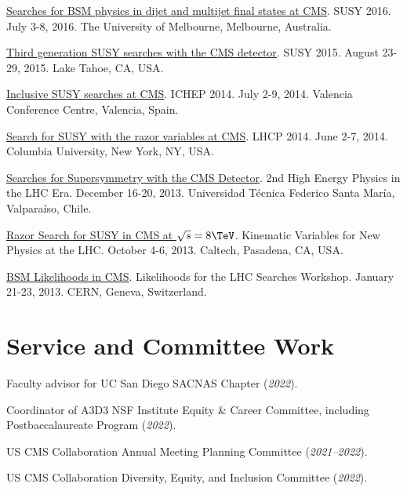 \documentclass{res}
\newcommand{\MarginText}[1]{\section{#1}\vspace{10pt}}
\begin{document}
\begin{resume}
{  \href{https://indico.cern.ch/event/443176/contributions/2154549/}{Searches for BSM physics in dijet and multijet final states at CMS}. SUSY 2016. July 3-8, 2016. The University of Melbourne, Melbourne, Australia.

  \href{https://indico.cern.ch/event/331032/contributions/1720249/}{Third generation SUSY searches with the CMS detector}. SUSY 2015. August 23-29, 2015. Lake Tahoe, CA, USA.

  \href{https://indico.ific.uv.es/indico/contributionDisplay.py?sessionId=24&contribId=289&confId=2025}{Inclusive SUSY searches at CMS}. ICHEP 2014. July 2-9, 2014. Valencia Conference Centre, Valencia, Spain.

  \href{https://indico.cern.ch/event/279518/contributions/634785/}{Search for SUSY with the razor variables at CMS}. LHCP 2014. June 2-7, 2014. Columbia University, New York, NY, USA.

  \href{https://indico.cern.ch/event/252857/contributions/1579321/}{Searches for Supersymmetry with the CMS Detector}. 2nd High Energy Physics in the LHC Era. December 16-20, 2013. Universidad T\'{e}cnica Federico Santa Mar\'{i}a, Valpara\'{i}so, Chile.

  \href{https://indico.cern.ch/event/261650/contributions/586374/}{Razor Search for SUSY in CMS at $\sqrt{s}=8\TeV$}. Kinematic Variables for New Physics at the LHC. October 4-6, 2013. Caltech, Pasadena, CA, USA.

  \href{https://indico.cern.ch/event/218693/contributions/1520333/}{BSM Likelihoods in CMS}. Likelihoods for the LHC Searches Workshop. January 21-23, 2013. CERN, Geneva, Switzerland.

  }{}


  \MarginText{Service and Committee Work}

  Faculty advisor for UC San Diego SACNAS Chapter (\textit{2022}).

  Coordinator of A3D3 NSF Institute Equity \& Career Committee, including Postbaccalaureate Program (\textit{2022}).

  US CMS Collaboration Annual Meeting Planning Committee (\textit{2021--2022}).

  US CMS Collaboration Diversity, Equity, and Inclusion Committee (\textit{2022}).


\end{resume}
\end{document}
